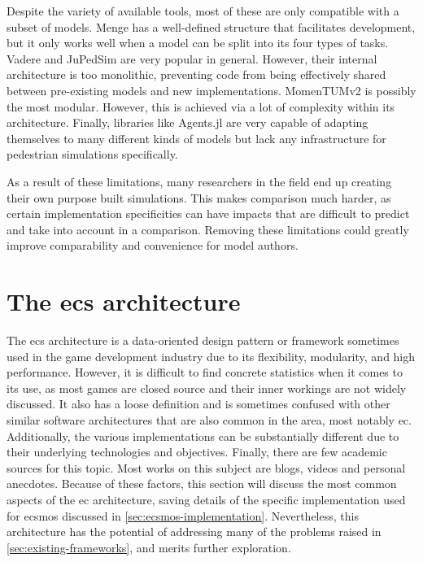 \documentclass[twoside, 11pt]{article}
\begin{document}
Despite the variety of available tools, most of these are only compatible with a subset of models. Menge has a well-defined structure that facilitates development, but it only works well when a model can be split into its four types of tasks. Vadere and JuPedSim are very popular in general. However, their internal architecture is too monolithic, preventing code from being effectively shared between pre-existing models and new implementations. MomenTUMv2 is possibly the most modular. However, this is achieved via a lot of complexity within its architecture. Finally, libraries like Agents.jl are very capable of adapting themselves to many different kinds of models but lack any infrastructure for pedestrian  simulations specifically.

As a result of these limitations, many researchers in the field end up creating their own purpose built simulations. This makes comparison much harder, as certain implementation specificities can have impacts that are difficult to predict and take into account in a comparison. Removing these limitations could greatly improve comparability and convenience for model authors.

\section{The \acrlong{ecs} architecture} \label{sec:ecs-architecture}

The \gls{ecs} architecture is a data-oriented design pattern or framework sometimes used in the game development industry due to its flexibility, modularity, and high performance. However, it is difficult to find concrete statistics when it comes to its use, as most games are closed source and their inner workings are not widely discussed. It also has a loose definition and is sometimes confused with other similar software architectures that are also common in the area, most notably \gls{ec}. Additionally, the various implementations can be substantially different due to their underlying technologies and objectives. Finally, there are few academic sources for this topic. Most works on this subject are blogs, videos and personal anecdotes. Because of these factors, this section will discuss the most common aspects of the \gls{ec} architecture, saving details of the specific implementation used for \gls{ecsmos} discussed in \autoref{sec:ecsmos-implementation}. Nevertheless, this architecture has the potential of addressing many of the problems raised in \autoref{sec:existing-frameworks}, and merits further exploration.
\end{document}
